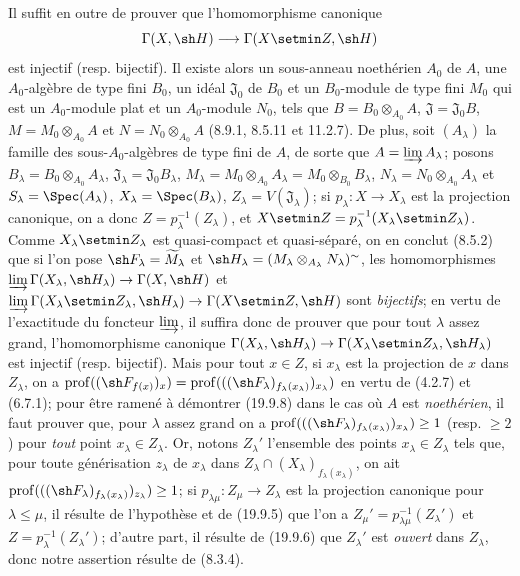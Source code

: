 Il suffit en outre de prouver que l'homomorphisme canonique
\[
  \Gamma(X,\sh H)\longrightarrow\Gamma(X\setmin Z,\sh H)
\]
est injectif (resp. bijectif). Il existe alors un sous-anneau noethérien $A_0$ de $A$, une $A_0$-algèbre de type fini $B_0$, un idéal $\mathfrak J_0$ de $B_0$ et un $B_0$-module de type fini $M_0$ qui est
un $A_0$-module plat et un $A_0$-module $N_0$, tels que $B=B_0\otimes_{A_0}A$, $\mathfrak J=\mathfrak J_0B$, $M=M_0\otimes_{A_0}A$ et $N=N_0\otimes_{A_0}A$ (8.9.1, 8.5.11 et 11.2.7). De plus, soit $(A_\lambda)$ la famille des sous-$A_0$-algèbres de type fini de $A$, de sorte que $A=\varinjlim A_\lambda$; posons $B_\lambda=B_0\otimes_{A_0}A_\lambda$, $\mathfrak J_\lambda=\mathfrak J_0B_\lambda$, $M_\lambda=M_0\otimes_{A_0}A_\lambda=M_0\otimes_{B_0}B_\lambda$, $N_\lambda=N_0\otimes_{A_0}A_\lambda$ et $S_\lambda=\Spec(A_\lambda)$, $X_\lambda=\Spec(B_\lambda)$, $Z_\lambda=V(\mathfrak J_\lambda)$; si $p_\lambda:X\to X_\lambda$ est la projection canonique, on a donc $Z=p_\lambda^{-1}(Z_\lambda)$, et $X\setmin Z=p_\lambda^{-1}(X_\lambda\setmin Z_\lambda)$. Comme $X_\lambda\setmin Z_\lambda$ est quasi-compact et quasi-séparé, on en conclut (8.5.2) que si l'on pose $\sh F_\lambda=\widetilde{M}_\lambda$ et $\sh H_\lambda=(M_\lambda\otimes_{A_\lambda}N_\lambda)^\sim$, les homomorphismes $\varinjlim\Gamma(X_\lambda,\sh H_\lambda)\to\Gamma(X,\sh H)$ et $\varinjlim\Gamma(X_\lambda\setmin Z_\lambda,\sh H_\lambda)\to\Gamma(X\setmin Z,\sh H)$
sont \emph{bijectifs}; en vertu de l'exactitude du foncteur $\varinjlim$, il suffira donc de prouver que pour tout $\lambda$ assez grand, l'homomorphisme canonique $\Gamma(X_\lambda,\sh H_\lambda)\to\Gamma(X_\lambda\setmin Z_\lambda,\sh H_\lambda)$ est injectif (resp. bijectif). Mais pour tout $x\in Z$, si $x_\lambda$ est la projection de $x$ dans $Z_\lambda$, on a $\operatorname{prof}((\sh F_{f(x)})_x)=\operatorname{prof}(((\sh F_\lambda)_{f_\lambda(x_\lambda)})_{x_\lambda})$ en vertu de (4.2.7) et (6.7.1); pour être ramené à démontrer (19.9.8) dans le cas où $A$ est \emph{noethérien}, il faut prouver que, pour $\lambda$ assez grand on a $\operatorname{prof}(((\sh F_\lambda)_{f_\lambda(x_\lambda)})_{x_\lambda})\geq1$ (resp. $\geq2$) pour \emph{tout} point $x_\lambda\in Z_\lambda$. Or, notons $Z_\lambda'$ l'ensemble des points $x_\lambda\in Z_\lambda$ tels que, pour toute générisation $z_\lambda$ de $x_\lambda$ dans $Z_\lambda\cap(X_\lambda)_{f_\lambda(x_\lambda)}$, on ait $\operatorname{prof}(((\sh F_\lambda)_{f_\lambda(x_\lambda)})_{z_\lambda})\geq1$; si $p_{\lambda\mu}:Z_\mu\to Z_\lambda$ est la projection canonique pour $\lambda\leq\mu$, il résulte de l'hypothèse et de (19.9.5) que l'on a $Z_\mu'=p_{\lambda\mu}^{-1}(Z_\lambda')$ et $Z=p_\lambda^{-1}(Z_\lambda')$; d'autre part, il résulte de (19.9.6) que $Z_\lambda'$ est \emph{ouvert} dans $Z_\lambda$, donc notre assertion résulte de (8.3.4).

